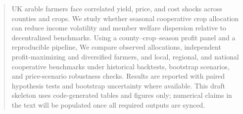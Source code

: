\begin{abstract}
UK arable farmers face correlated yield, price, and cost shocks across counties and crops.
We study whether seasonal cooperative crop allocation can reduce income volatility and
member welfare dispersion relative to decentralized benchmarks.
Using a county--crop--season profit panel and a reproducible \copper{} pipeline,
\coppercontrib{}
We compare observed allocations, independent profit-maximizing and diversified farmers,
and local, regional, and national cooperative benchmarks under historical backtests,
bootstrap scenarios, and price-scenario robustness checks.
Results are reported with paired hypothesis tests and bootstrap uncertainty where available.
This draft skeleton uses code-generated tables and figures only; numerical claims in the
text will be populated once all required outputs are synced.
\end{abstract}
